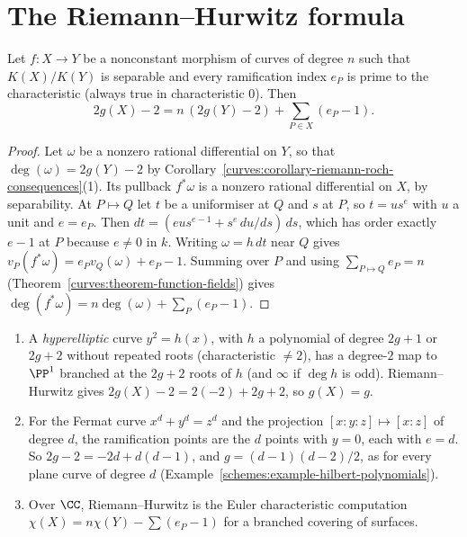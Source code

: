 \section{The Riemann--Hurwitz formula}\label{curves:section-riemann-hurwitz}

\begin{theorem}\label{curves:theorem-riemann-hurwitz}
Let $f \colon X \to Y$ be a nonconstant morphism of curves of degree $n$ such that $K(X)/K(Y)$ is separable and every ramification index $e_P$ is prime to the
characteristic (always true in characteristic $0$). Then
\[
2g(X) - 2 = n\,(2g(Y) - 2) + \sum_{P \in X}(e_P - 1) .
\]
\end{theorem}

\begin{proof}
Let $\omega$ be a nonzero rational differential on $Y$, so that $\deg(\omega) = 2g(Y) - 2$ by Corollary~\ref{curves:corollary-riemann-roch-consequences}(1). Its pullback
$f^*\omega$ is a nonzero rational differential on $X$, by separability. At $P \mapsto Q$ let $t$ be a uniformiser at $Q$ and $s$ at $P$, so $t = us^{e}$ with $u$ a unit and
$e = e_P$. Then $dt = (eus^{e-1} + s^e\,du/ds)\,ds$, which has order exactly $e - 1$ at $P$ because $e \neq 0$ in $k$. Writing $\omega = h\,dt$ near $Q$ gives
$v_P(f^*\omega) = e_Pv_Q(\omega) + e_P - 1$. Summing over $P$ and using $\sum_{P \mapsto Q}e_P = n$ (Theorem~\ref{curves:theorem-function-fields}) gives
$\deg(f^*\omega) = n\deg(\omega) + \sum_P(e_P - 1)$.
\end{proof}

\begin{example}\label{curves:example-riemann-hurwitz}
\begin{enumerate}
\item A \emph{hyperelliptic} curve $y^2 = h(x)$, with $h$ a polynomial of degree $2g + 1$ or $2g + 2$ without repeated roots (characteristic $\neq 2$), has a degree-$2$ map to
$\PP^1$ branched at the $2g + 2$ roots of $h$ (and $\infty$ if $\deg h$ is odd). Riemann--Hurwitz gives $2g(X) - 2 = 2(-2) + 2g + 2$, so $g(X) = g$.
\item For the Fermat curve $x^d + y^d = z^d$ and the projection $[x : y : z] \mapsto [x : z]$ of degree $d$, the ramification points are the $d$ points with $y = 0$, each with $e = d$.
So $2g - 2 = -2d + d(d - 1)$, and $g = (d-1)(d-2)/2$, as for every plane curve of degree $d$ (Example~\ref{schemes:example-hilbert-polynomials}).
\item Over $\CC$, Riemann--Hurwitz is the Euler characteristic computation $\chi(X) = n\chi(Y) - \sum(e_P - 1)$ for a branched covering of surfaces.
\end{enumerate}
\end{example}

